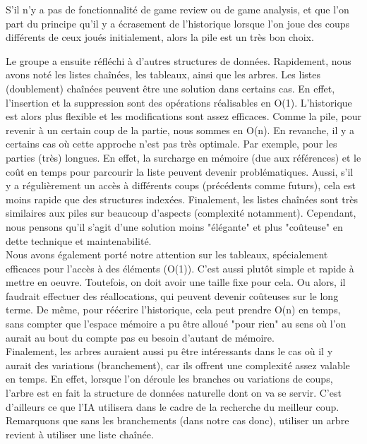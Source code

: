 \documentclass{article}
\begin{document}
S'il n'y a pas de fonctionnalité de game review ou de game analysis, et que l'on part du principe qu'il y a écrasement de l'historique
lorsque l'on joue des coups différents de ceux joués initialement, alors la pile est un très bon choix.\\

\par Le groupe a ensuite réfléchi à d'autres structures de données. Rapidement, nous avons noté les listes chaînées, les tableaux,
ainsi que les arbres.
Les listes (doublement) chaînées peuvent être une solution dans certains cas. En effet, l'insertion et la suppression sont des opérations
réalisables en O(1). L'historique est alors plus flexible et les modifications sont assez efficaces. Comme la pile, pour revenir à un
certain coup de la partie, nous sommes en O(n). En revanche, il y a certains cas où cette approche n'est pas très optimale. Par exemple,
pour les parties (très) longues. En effet, la surcharge en mémoire (due aux références) et le coût en temps pour parcourir la liste peuvent
devenir problématiques. Aussi, s'il y a régulièrement un accès à différents coups (précédents comme futurs), cela est moins rapide que des
structures indexées. Finalement, les listes chaînées sont très similaires aux piles sur beaucoup d'aspects (complexité notamment). Cependant,
nous pensons qu'il s'agit d'une solution moins "élégante" et plus "coûteuse" en dette technique et maintenabilité.\\
Nous avons également porté notre attention sur les tableaux, spécialement efficaces pour l'accès à des éléments (O(1)). C'est aussi plutôt
simple et rapide à mettre en oeuvre. Toutefois, on doit avoir une taille fixe pour cela. Ou alors, il faudrait effectuer des réallocations,
qui peuvent devenir coûteuses sur le long terme. De même, pour réécrire l'historique, cela peut prendre O(n) en temps, sans compter que
l'espace mémoire a pu être alloué "pour rien" au sens où l'on aurait au bout du compte pas eu besoin d'autant de mémoire.\\
Finalement, les arbres auraient aussi pu être intéressants dans le cas où il y aurait des variations (branchement), car ils offrent une complexité
assez valable en temps. En effet, lorsque l'on déroule les branches ou variations de coups,
l'arbre est en fait la structure de données naturelle dont on va se servir. C'est d'ailleurs ce que l'IA utilisera dans le cadre de la recherche
du meilleur coup.\\
Remarquons que sans les branchements (dans notre cas donc), utiliser un arbre revient à utiliser une liste chaînée.
\end{document}
